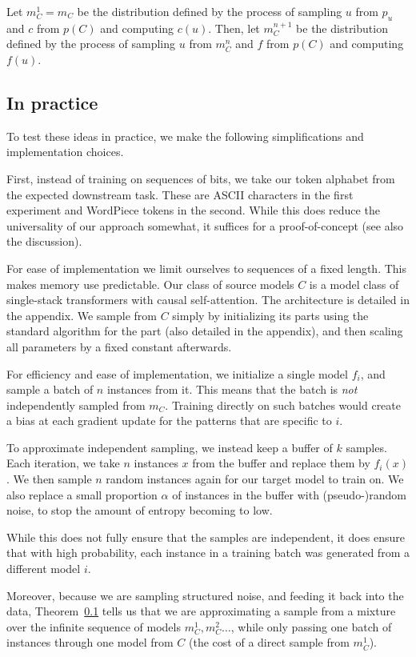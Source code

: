 \documentclass{article} %
\begin{document}
Let $m^1_C = m_C$ be the distribution defined by the process of sampling $u$ from $p_u$ and $c$ from $p(C)$ and computing $c(u)$. Then, let $m^{n+1}_C$ be the distribution defined by the process of sampling $u$ from $m^n_C$ and $f$ from $p(C)$ and computing $f(u)$.

\subsection{In practice}

To test these ideas in practice, we make the following simplifications and implementation choices. 

First, instead of training on sequences of bits, we take our token alphabet from the expected downstream task. These are ASCII characters in the first experiment and WordPiece tokens in the second. While this does reduce the universality of our approach somewhat, it suffices for a proof-of-concept (see also the discussion).

For ease of implementation we limit ourselves to sequences of a fixed length. This makes memory use predictable. Our class of source models $C$ is a model class of single-stack transformers with causal self-attention. The architecture is detailed in the appendix. We sample from $C$ simply by initializing its parts using the standard algorithm for the part (also detailed in the appendix), and then scaling all parameters by a fixed constant afterwards. 

For efficiency and ease of implementation, we initialize a single model $f_i$, and sample a batch of $n$ instances from it. This means that the batch is \emph{not} independently sampled from $m_C$. Training directly on such batches would create a bias at each gradient update for the patterns that are specific to $i$. 

To approximate independent sampling, we instead keep a buffer of $k$ samples. Each iteration, we take $n$ instances $x$ from the buffer and replace them by $f_i(x)$. We then sample $n$ random instances again for our target model to train on. We also replace a small proportion $\alpha$ of instances in the buffer with (pseudo-)random noise, to stop the amount of entropy becoming to low.

While this does not fully ensure that the samples are independent, it does ensure that with high probability, each instance in a training batch was generated from a different model $i$.

Moreover, because we are sampling structured noise, and feeding it back into the data, Theorem~\ref{} tells us that we are approximating a sample from a mixture over the infinite sequence of models $m^1_C, m^2_C\ldots$, while only passing one batch of instances through one model from $C$ (the cost of a direct sample from $m^1_C$).\footnotemark
{}
\end{document}
